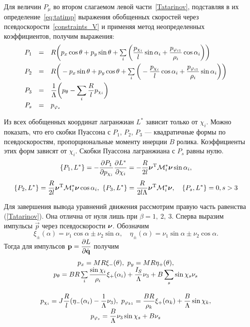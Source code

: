 Для величин $P_\mu$ во втором слагаемом левой части~\ref{Tatarinov}, подставляя в их определение~\ref{eq:tatimp} выражения обобщенных скоростей через псевдоскорости~\ref{constraints_V} и применяя метод неопределенных коэффициентов, получим выражения:
\begin{equation}\label{P}
    \begin{array}{rcl}
        P_1 & = & R\bigg(p_x\cos\theta + p_y\sin\theta + \sum\limits_{i}\bigg(\ddfrac{p_{\chi_i}}{l}\sin\alpha_i +  \ddfrac{p_{\phi_{i1}}}{\rho_i}\cos\alpha_i\bigg)\bigg)\vsp
        P_2 & = & R\bigg(-p_x\sin\theta + p_y\cos\theta + \sum\limits_{i}\bigg(-\ddfrac{p_{\chi_i}}{l}\cos\alpha_i +  \ddfrac{p_{\phi_{i1}}}{\rho_i}\sin\alpha_i\bigg)\bigg)\vsp
        P_3 & = & \ddfrac{1}{\Lambda}\bigg(p_\theta - \sum\limits_{i}\ddfrac{R}{l}p_{\chi_i}\bigg)\vsp
        P_s & = & p_{\phi_s}
    \end{array}
\end{equation}

Из всех обобщенных координат лагранжиан $L^{*}$ зависит только от $\chi_i$. Можно показать, что его скобки Пуассона с $P_1$, $P_2$, $P_3$  --- квадратичные формы по псевдоскоростям, пропорциональные моменту инерции $B$ ролика. Коэффициенты этих форм зависят от $\chi_i$. Скобки Пуассона лагранжиана с $P_s$ равны нулю.
$$
\{P_1, L^*\} = -\frac{\partial P_1}{\partial p_{\chi_i}}\frac{\partial L^*}{\partial \chi_i} = -\frac{R}{2l}\boldsymbol{\mathbf{\nu}}^\mathrm{T}\mathcal{M}^*_i\boldsymbol{\mathbf{\nu}}\sin\alpha_i,
$$
$$
\{P_2, L^*\} = \frac{R}{2l}\boldsymbol{\mathbf{\nu}}^\mathrm{T}\mathcal{M}^*_i\boldsymbol{\mathbf{\nu}}\cos\alpha_i,\  
\{P_3, L^*\} = \frac{R}{2l\Lambda}\boldsymbol{\mathbf{\nu}}^\mathrm{T}\mathcal{M}^*_i\boldsymbol{\mathbf{\nu}},\quad \{P_s,L^*\} = 0, s>3
$$

Для завершения вывода уравнений движения рассмотрим правую часть равенства (\ref{Tatarinov}). Она отлична от нуля лишь при $\beta = 1,\ 2,\ 3$. Сперва выразим импульсы $\vec{p}$ через псевдоскорости $\boldsymbol{\mathbf{\nu}}$. Обозначим
$$
    \xi_\pm(\alpha) = \nu_1\cos\alpha \pm \nu_2\sin\alpha, \quad \eta_\pm(\alpha) = \nu_1\sin\alpha \pm \nu_2\cos\alpha.
$$
Тогда для импульсов $\boldsymbol{\mathbf{p}} = \displaystyle\frac{\displaystyle \partial L}{\displaystyle \partial \dot{\boldsymbol{\mathbf{q}}}}$ получим
\begin{equation}\label{p}
    \begin{array}{c}
        p_x  =  MR\xi_-(\theta), \ p_y = MR\eta_+(\theta),\\
        p_\theta  =  BR\sum\limits_i\ddfrac{\sin\chi_i}{\rho_i}\xi_+(\alpha_i) + \ddfrac{I_S}{\Lambda}\nu_3 + B\sum\limits_s\sin\chi_s\nu_s\vsp\\
        p_{\chi_i}  =  J\ddfrac{R}{l}(\eta_-(\alpha_i) - \ddfrac{1}{\Lambda}\nu_3), \ p_{\phi_{k1}}  =  \ddfrac{BR}{\rho_k}\xi_+(\alpha_k)+\ddfrac{B}{\Lambda}\sin\chi_k,\\
        p_{\phi_s}  =  \ddfrac{B}{\Lambda}\nu_3\sin\chi_s + B\nu_s
    \end{array}
\end{equation}

